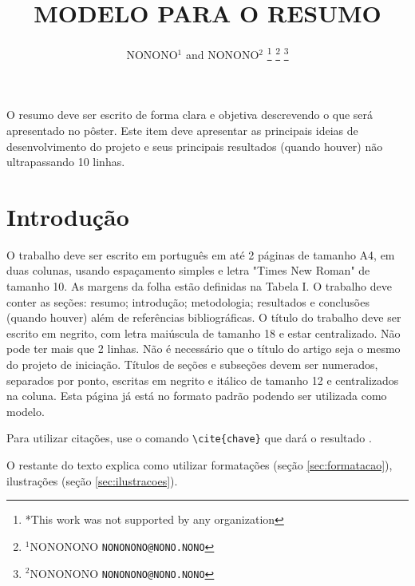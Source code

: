 \documentclass[a4paper,10pt,twocolumn,fleqn]{article}
\date{\vspace{-5ex}}
\date{}
\author{NONONO$^{1}$ and NONONO$^{2}$%
        \thanks{*This work was not supported by any organization}%
        \thanks{$^{1}$NONONONO
            {\tt\small NONONONO@NONO.NONO}}%
        \thanks{$^{2}$NONONONO
            {\tt\small NONONONO@NONO.NONO}}%
    }
\begin{document}
 
        
    \title{\vspace{-2em}MODELO PARA O RESUMO}
   
   
    \maketitle
    \thispagestyle{fancy}
    
    
    \begin{resumo}
    O resumo deve ser escrito de forma clara e objetiva descrevendo o que será apresentado no pôster. Este item deve apresentar as principais ideias de desenvolvimento do projeto e seus principais resultados (quando houver) não ultrapassando 10 linhas.
    \end{resumo}
    
    
         
    \section{Introdução}
    O trabalho deve ser escrito em português em até 2 páginas de tamanho A4, em duas colunas, usando espaçamento simples e letra "Times New Roman" de tamanho 10. As margens da folha estão definidas na Tabela I. O trabalho deve conter as seções: resumo; introdução; metodologia; resultados e conclusões (quando houver) além de referências bibliográficas. 
    O título do trabalho deve ser escrito em negrito, com letra maiúscula de tamanho 18 e estar centralizado. Não pode ter mais que 2 linhas. Não é necessário que o título do artigo seja o mesmo do projeto de iniciação.
    Títulos de seções e subseções devem ser numerados, separados por ponto, escritas em negrito e itálico de tamanho 12 e centralizados na coluna. Esta página já está no formato padrão podendo ser utilizada como modelo.

     
    Para utilizar citações, use o comando \verb|\cite{chave}| que dará o resultado \cite{inp:wang2006,inp:saska2006,inp:okada2011,inp:albad2017}. 
     
    O restante do texto explica como utilizar formatações (seção \ref{sec:formatacao}), ilustrações (seção \ref{sec:ilustracoes}).
    
\end{document}
